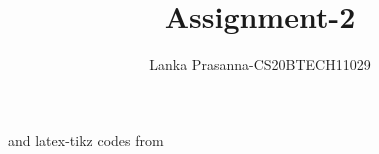 \documentclass[journal,12pt,twocolumn]{IEEEtran}
\DeclareMathOperator*{\Res}{Res}
\begin{document}
\newcommand{\BEQA}{\begin{eqnarray}}
\newcommand{\EEQA}{\end{eqnarray}}
\newcommand{\define}{\stackrel{\triangle}{=}}

\raggedbottom
\setlength{\parindent}{0pt}
\providecommand{\mbf}{\mathbf}
\providecommand{\pr}[1]{\ensuremath{\Pr\left(#1\right)}}
\providecommand{\qfunc}[1]{\ensuremath{Q\left(#1\right)}}
\providecommand{\sbrak}[1]{\ensuremath{{}\left[#1\right]}}
\providecommand{\lsbrak}[1]{\ensuremath{{}\left[#1\right.}}
\providecommand{\rsbrak}[1]{\ensuremath{{}\left.#1\right]}}
\providecommand{\brak}[1]{\ensuremath{\left(#1\right)}}
\providecommand{\lbrak}[1]{\ensuremath{\left(#1\right.}}
\providecommand{\rbrak}[1]{\ensuremath{\left.#1\right)}}
\providecommand{\cbrak}[1]{\ensuremath{\left\{#1\right\}}}
\providecommand{\lcbrak}[1]{\ensuremath{\left\{#1\right.}}
\providecommand{\rcbrak}[1]{\ensuremath{\left.#1\right\}}}
\theoremstyle{remark}
\newtheorem{rem}{Remark}
\newcommand{\sgn}{\mathop{\mathrm{sgn}}}
\providecommand{\abs}[1]{\vert#1\vert}
\providecommand{\res}[1]{\Res\displaylimits_{#1}} 
\providecommand{\norm}[1]{\lVert#1\rVert}
\providecommand{\mtx}[1]{\mathbf{#1}}
\providecommand{\mean}[1]{E[ #1 ]}
\providecommand{\fourier}{\overset{\mathcal{F}}{ \rightleftharpoons}}
\providecommand{\system}{\overset{\mathcal{H}}{ \longleftrightarrow}}
\newcommand{\solution}{\noindent \textbf{Solution: }}
\newcommand{\cosec}{\,\text{cosec}\,}
\providecommand{\dec}[2]{\ensuremath{\overset{#1}{\underset{#2}{\gtrless}}}}
\newcommand{\myvec}[1]{\ensuremath{\begin{pmatrix}#1\end{pmatrix}}}
\newcommand{\mydet}[1]{\ensuremath{\begin{vmatrix}#1\end{vmatrix}}}
\makeatletter
{}
\makeatother
\let\StandardTheFigure\thefigure
\let\vec\mathbf
\renewcommand{\thefigure}{\theproblem}
\def\putbox#1#2#3{\makebox[0in][l]{\makebox[#1][l]{}\raisebox{\baselineskip}[0in][0in]{\raisebox{#2}[0in][0in]{#3}}}}
     \def\rightbox#1{\makebox[0in][r]{#1}}
     \def\centbox#1{\makebox[0in]{#1}}
     \def\topbox#1{\raisebox{-\baselineskip}[0in][0in]{#1}}
     \def\midbox#1{\raisebox{-0.5\baselineskip}[0in][0in]{#1}}
\vspace{3cm}
\title{Assignment-2}
\author{Lanka Prasanna-CS20BTECH11029}
\maketitle
\newpage
\bigskip
\renewcommand{\thefigure}{\theenumi}
\renewcommand{\thetable}{\theenumi}
%
and latex-tikz codes from 
%
\begin{lstlisting}
    
\end{lstlisting}
\end{document}
